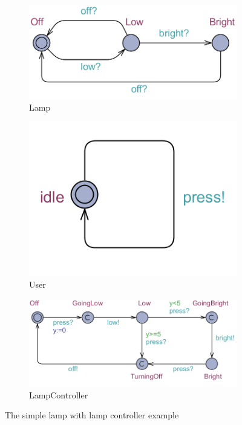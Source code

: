 \documentclass{article}
\begin{document}
\begin{figure}[h!]
	\centering
	\begin{subfigure}{.5\textwidth}
		\centering
		\includegraphics[width=.9\linewidth]{LampController/figTLamp}
		\caption{Lamp}
	\end{subfigure}
	\begin{subfigure}{.3\textwidth}
		\centering
		\includegraphics[width=.9\linewidth]{LampController/figTUser}
		\caption{User}
	\end{subfigure}
	\begin{subfigure}{.7\textwidth}
		\centering
		\includegraphics[width=.9\linewidth]{LampController/figTLampController}
		\caption{LampController}
	\end{subfigure}
	\caption{The simple lamp with lamp controller example}
	\label{fig:SimpleLampController}
\end{figure}
\end{document}
